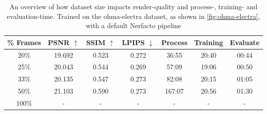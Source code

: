 \begin{comment}
\begin{table}[h]
\centering
\begin{tabular}{ccccccc}
\hline
\# Samples & PSNR $\uparrow$ & SSIM $\uparrow$ & LPIPS $\downarrow$ & Process Time & Training Time & Evaluate Time \\ \hline
5\%                       & 17.955    & 0.458     & 0.338    & 02:37    & 29:03    & 00:19    \\
10\%                      & 19.422    & 0.505     & 0.280    & 06:10    & 28:31    & 00:24    \\
15\%                      & 19.841    & 0.537     & 0.268    & 12:50    & 28:39    & 00:32    \\
20\%                      & 20.341    & 0.555     & 0.269    & 18:17    & 28:24    & 00:35    \\
25\%                      & 20.118    & 0.548     & 0.263    & 30:05    & 49:08    & 01:15    \\
40\%                      & 22.371    & 0.649     & 0.258    & 58:01    & 28:50    & 01:13    \\
50\%                      & 21.738    & 0.623     & 0.263    & -    & -    & -    \\
75\%                      & -    & -     & -    & -    & -    & -    \\
\multicolumn{1}{l}{100\%} & -    & -     & -    & -    & -    & -    \\ \hline
\end{tabular}
\caption{An overview of how dataset size impacts render-quality and process-, training- and evaluation-time. Trained on \autoref{fig:ohma-electra} with a vanilla Nerfacto pipeline}
\label{tab:colmap-dataset-size}
\end{table}
\end{comment}

\begin{table}[h]
\centering
\begin{tabular}{|ccccccc|}
\hline
\% Frames & PSNR $\uparrow$ & SSIM $\uparrow$ & LPIPS $\downarrow$ & Process & Training & Evaluate \\ \hline
20\%        & 19.692    & 0.523     & 0.272    & 36:55    & 20:40    & 00:44    \\
25\%        & 20.043    & 0.544     & 0.269    & 57:09    & 19:06    & 00:50    \\
33\%        & 20.135    & 0.547     & 0.273    & 82:08    & 20:15    & 01:05    \\
50\%        & 21.103    & 0.590     & 0.273    & 167:07    & 20:56    & 01:30    \\
100\%       & -    & -     & -    & -    & -    & -    \\
\hline
\end{tabular}
\caption{An overview of how dataset size impacts render-quality and process-, training- and evaluation-time. Trained on the ohma-electra dataset, as shown in \autoref{fig:ohma-electra}, with a default Nerfacto pipeline}
\label{tab:colmap-dataset-size}
\end{table}